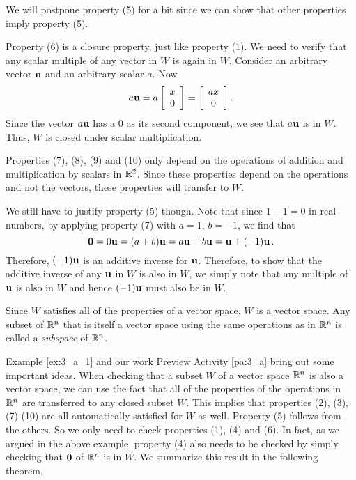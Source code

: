 \begin{example}
We will postpone property (5) for a bit since we can show that other properties imply property (5).

Property (6) is a closure property, just like property (1). We need to verify that \underline{any} scalar multiple of \underline{any} vector in $W$ is again in $W$. Consider an arbitrary vector $\mathbf{u}$ and an arbitrary scalar $a$. Now
\[a \mathbf{u} = a\left[ \begin{array}{c} x \\ 0 \end{array} \right] = \left[ \begin{array}{c} ax \\ 0 \end{array} \right].\]
Since the vector $a \mathbf{u}$ has a 0 as its second component, we see that $a \mathbf{u}$ is in $W$. Thus, $W$ is closed under scalar multiplication. 

Properties (7), (8), (9) and (10) only depend on the operations of addition and multiplication by scalars in $\mathbb{R}^2$. Since these properties depend on the operations and not the vectors, these properties will transfer to $W$. 

We still have to justify property (5) though. Note that since $1-1=0$ in real numbers, by applying property (7) with $a=1$, $b=-1$, we find that 
\[\mathbf{0}=0\mathbf{u}=(a+b)\mathbf{u}=a\mathbf{u}+b\mathbf{u}= \mathbf{u} + (-1)\mathbf{u} \,.\]
Therefore, $(-1)\mathbf{u}$ is an additive inverse for $\mathbf{u}$. Therefore, to show that the additive inverse of any $\mathbf{u}$ in $W$ is also in $W$, we simply note that any multiple of $\mathbf{u}$ is also in $W$ and hence $(-1)\mathbf{u}$ must also be in $W$.

Since $W$ satisfies all of the properties of a vector space, $W$ is a vector space. Any subset of $\mathbb{R}^n$ that is itself a vector space using the same operations as in $\mathbb{R}^n$ is called a \emph{subspace} of $\mathbb{R}^n$. 

\end{example} 



Example \ref{ex:3_a_1} and our work Preview Activity \ref{pa:3_a} bring out some important ideas. When checking that a subset $W$ of a vector space $\mathbb{R}^n$ is also a vector space, we can use the fact that all of the properties of the operations in $\mathbb{R}^n$ are transferred to any closed subset $W$. This implies that properties (2), (3), (7)-(10) are all automatically satisfied for $W$ as well. Property (5) follows from the others. So we only need to check properties (1), (4) and (6). In fact, as we argued in the above example, property (4) also needs to be checked by simply checking that $\mathbf{0}$ of $\mathbb{R}^n$ is in $W$. We summarize this result in the following theorem.


